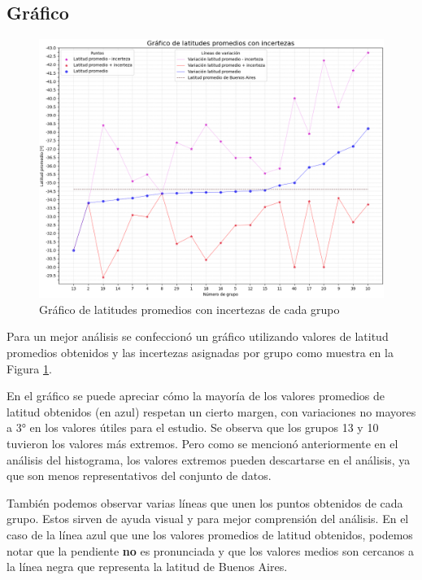 \documentclass[12pt, a4paper]{article} %
\begin{document}
\subsection{Gráfico}
\begin{figure}[H]
    \centering
    \includegraphics[width=15cm]{images/gráfico_análisis.png}
    \caption{Gráfico de latitudes promedios con incertezas de cada grupo}
    \label{fig:grafico}
\end{figure}

Para un mejor análisis se confeccionó un gráfico utilizando valores de latitud promedios obtenidos y las incertezas asignadas por grupo como muestra en la Figura \ref{fig:grafico}.

En el gráfico se puede apreciar cómo la mayoría de los valores promedios de latitud obtenidos (en azul) respetan un cierto margen, con variaciones no mayores a $\ang{3}$ en los valores útiles para el estudio. Se observa que los grupos 13 y 10 tuvieron los valores más extremos. Pero como se mencionó anteriormente en el análisis del histograma, los valores extremos pueden descartarse en el análisis, ya que son menos representativos del conjunto de datos.

También podemos observar varias líneas que unen los puntos obtenidos de cada grupo. Estos sirven de ayuda visual y para mejor comprensión del análisis. En el caso de la línea azul que une los valores promedios de latitud obtenidos, podemos notar que la pendiente \textbf{no} es pronunciada y que los valores medios son cercanos a la línea negra que representa la latitud de Buenos Aires. 
\end{document}

